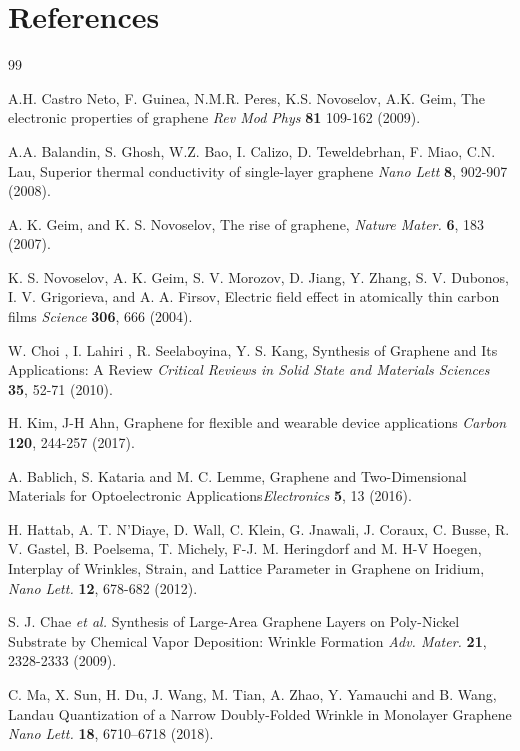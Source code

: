\documentclass[preprint,aps,preprint,amsmath,amssymb]{revtex4-1}
\begin{document}
\section*{References}
\begin{thebibliography} {99}	

 A.H. Castro Neto, F. Guinea, N.M.R. Peres, K.S. Novoselov, A.K. Geim, The electronic properties of graphene \textit{Rev Mod Phys} \textbf{81} 109-162 (2009). 

 A.A. Balandin, S. Ghosh, W.Z. Bao, I. Calizo, D. Teweldebrhan, F. Miao, C.N. Lau, Superior thermal conductivity of single-layer graphene \textit{Nano Lett} \textbf{8}, 902-907 (2008).

 A. K. Geim, and K. S. Novoselov, The rise of graphene, \textit{Nature Mater.} \textbf{6}, 183 (2007).

  K. S. Novoselov, A. K. Geim, S. V. Morozov, D. Jiang, Y. Zhang, S. V. Dubonos, I. V. Grigorieva, and A. A. Firsov, Electric field effect in atomically thin carbon films \textit{Science} \textbf{306}, 666 (2004).

 W. Choi , I. Lahiri , R. Seelaboyina, Y. S. Kang, Synthesis of Graphene and Its Applications: A Review \textit{Critical Reviews in Solid State and Materials Sciences} \textbf{35}, 52-71 (2010).

 H. Kim, J-H Ahn, Graphene for flexible and wearable device applications \textit{Carbon} \textbf{120}, 244-257 (2017).

 A. Bablich, S. Kataria and M. C. Lemme, Graphene and Two-Dimensional Materials for Optoelectronic Applications\textit{Electronics} \textbf{5}, 13 (2016).

 H. Hattab, A. T. N’Diaye, D. Wall, C. Klein, G. Jnawali, J. Coraux, C. Busse, R. V. Gastel, B. Poelsema, T. Michely, F-J. M. Heringdorf and M. H-V Hoegen, Interplay of Wrinkles, Strain, and Lattice Parameter in Graphene on Iridium, \textit{Nano Lett.} \textbf{12}, 678-682 (2012).

  S. J. Chae \textit{et al.} Synthesis of Large-Area Graphene Layers on Poly-Nickel Substrate by Chemical Vapor Deposition: Wrinkle Formation \textit{Adv. Mater.} \textbf{21}, 2328-2333 (2009).

 C. Ma, X. Sun, H. Du, J. Wang, M. Tian, A. Zhao, Y. Yamauchi and B. Wang, Landau Quantization of a Narrow Doubly-Folded Wrinkle in Monolayer Graphene \textit{Nano Lett.} \textbf{18}, 6710–6718 (2018).



\end{thebibliography}
\end{document}
